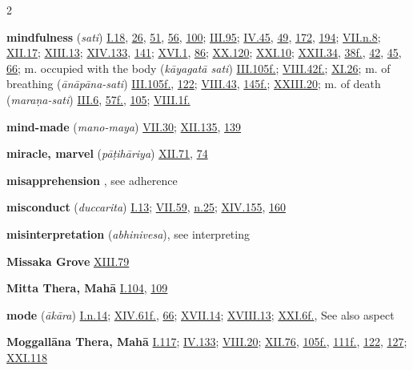 \begin{multicols}{2}
\begin{vismHanging}
\par\textbf{mindfulness} (\emph{sati}) \hyperlink{I.18}{I.18}{}, \hyperlink{I.26}{26}{}, \hyperlink{I.51}{51}{}, \hyperlink{I.56}{56}{}, \hyperlink{I.100}{100}{}; \hyperlink{III.95}{III.95}{}; \hyperlink{IV.45}{IV.45}{}, \hyperlink{IV.49}{49}{}, \hyperlink{IV.172}{172}{}, \hyperlink{IV.194}{194}{}; \hyperlink{VII.n8}{VII.n.8}{}; \hyperlink{XII.17}{XII.17}{}; \hyperlink{XIII.13}{XIII.13}{}; \hyperlink{XIV.133}{XIV.133}{}, \hyperlink{XIV.141}{141}{}; \hyperlink{XVI.1}{XVI.1}{}, \hyperlink{XVI.86}{86}{}; \hyperlink{XX.120}{XX.120}{}; \hyperlink{XXI.10}{XXI.10}{}; \hyperlink{XXII.34}{XXII.34}{}, \hyperlink{XXII.38}{38f.}{}, \hyperlink{XXII.42}{42}{}, \hyperlink{XXII.45}{45}{}, \hyperlink{XXII.66}{66}{}; m. occupied with the body (\emph{kāyagatā sati}) \hyperlink{III.105}{III.105f.}{}; \hyperlink{VIII.42}{VIII.42f.}{}; \hyperlink{XI.26}{XI.26}{}; m. of breathing (\emph{ānāpāna-sati}) \hyperlink{III.105}{III.105f.}{}, \hyperlink{III.122}{122}{}; \hyperlink{VIII.43}{VIII.43}{}, \hyperlink{VIII.145}{145f.}{}; \hyperlink{XXIII.20}{XXIII.20}{}; m. of death (\emph{maraṇa-sati}) \hyperlink{III.6}{III.6}{}, \hyperlink{III.57}{57f.}{}, \hyperlink{III.105}{105}{}; \hyperlink{VIII.1}{VIII.1f.}{}
\par\textbf{mind-made} (\emph{mano-maya}) \hyperlink{VII.30}{VII.30}{}; \hyperlink{XII.135}{XII.135}{}, \hyperlink{XII.139}{139}{}
\par\textbf{miracle, marvel} (\emph{pāṭihāriya}) \hyperlink{XII.71}{XII.71}{}, \hyperlink{XII.74}{74}{}
\par\textbf{misapprehension} , see adherence
\par\textbf{misconduct} (\emph{duccarita}) \hyperlink{I.13}{I.13}{}; \hyperlink{VII.59}{VII.59}{}, \hyperlink{VII.n25}{n.25}{}; \hyperlink{XIV.155}{XIV.155}{}, \hyperlink{XIV.160}{160}{}
\par\textbf{misinterpretation} (\emph{abhinivesa}), see interpreting 
\par\textbf{Missaka Grove} \hyperlink{XIII.79}{XIII.79}{}
\par\textbf{Mitta Thera, Mahā} \hyperlink{I.104}{I.104}{}, \hyperlink{I.109}{109}{}
\par\textbf{mode} (\emph{ākāra}) \hyperlink{I.n14}{I.n.14}{}; \hyperlink{XIV.61}{XIV.61f.}{}, \hyperlink{XIV.66}{66}{}; \hyperlink{XVII.14}{XVII.14}{}; \hyperlink{XVIII.13}{XVIII.13}{}; \hyperlink{XXI.6}{XXI.6f.}{}, See also aspect 
\par\textbf{Moggallāna Thera, Mahā} \hyperlink{I.117}{I.117}{}; \hyperlink{IV.133}{IV.133}{}; \hyperlink{VIII.20}{VIII.20}{}; \hyperlink{XII.76}{XII.76}{}, \hyperlink{XII.105}{105f.}{}, \hyperlink{XII.111}{111f.}{}, \hyperlink{XII.122}{122}{}, \hyperlink{XII.127}{127}{}; \hyperlink{XXI.118}{XXI.118}{}

\end{vismHanging}
\end{multicols}
